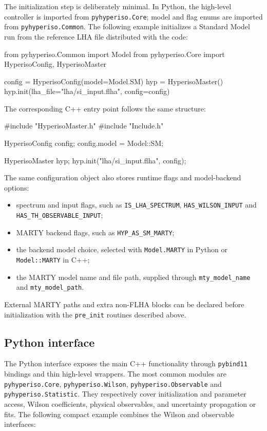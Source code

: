 \documentclass[preprint,11pt]{elsarticle}
\begin{document}
The initialization step is deliberately minimal. In Python, the high-level controller is imported from \texttt{pyhyperiso.Core}; model and flag enums are imported from \texttt{pyhyperiso.Common}. The following example initializes a Standard Model run from the reference LHA file distributed with the code:

\begin{pycode}
from pyhyperiso.Common import Model
from pyhyperiso.Core import HyperisoConfig, HyperisoMaster

config = HyperisoConfig(model=Model.SM)
hyp = HyperisoMaster()
hyp.init(lha_file="lha/si_input.flha", config=config)
\end{pycode}

The corresponding C++ entry point follows the same structure:

\begin{cppcode}
#include "HyperisoMaster.h"
#include "Include.h"

HyperisoConfig config;
config.model = Model::SM;

HyperisoMaster hyp;
hyp.init("lha/si_input.flha", config);
\end{cppcode}

The same configuration object also stores runtime flags and model-backend options:
\begin{itemize}[leftmargin=1.5em]
  \item spectrum and input flags, such as \texttt{IS\_LHA\_SPECTRUM}, \texttt{HAS\_WILSON\_INPUT} and \texttt{HAS\_TH\_OBSERVABLE\_INPUT};
  \item MARTY backend flags, such as \texttt{HYP\_AS\_SM\_MARTY};
  \item the backend model choice, selected with \texttt{Model.MARTY} in Python or \texttt{Model::MARTY} in C++;
  \item the MARTY model name and file path, supplied through \texttt{mty\_model\_name} and \texttt{mty\_model\_path}.
\end{itemize}
External MARTY paths and extra non-FLHA blocks can be declared before initialization with the \texttt{pre\_init} routines described above.

\subsection{Python interface}

The Python interface exposes the main C++ functionality through \texttt{pybind11} bindings and thin high-level wrappers.  The most common modules are \texttt{pyhyperiso.Core}, \texttt{pyhyperiso.Wilson}, \texttt{pyhyperiso.Observable} and \texttt{pyhyperiso.Statistic}.  They respectively cover initialization and parameter access, Wilson coefficients, physical observables, and uncertainty propagation or fits.  The following compact example combines the Wilson and observable interfaces:
\end{document}
